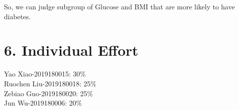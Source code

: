 \documentclass[11pt]{article}
\begin{document}
So, we can judge subgroup of Glucose and BMI that are more likely to have diabetes.

\section{6. Individual Effort}
Yao Xiao-2019180015: 30\% \\
Ruochen Liu-2019180018: 25\% \\
Zebiao Guo-2019180020: 25\% \\
Jun Wu-2019180006: 20\% \\
\end{document}
